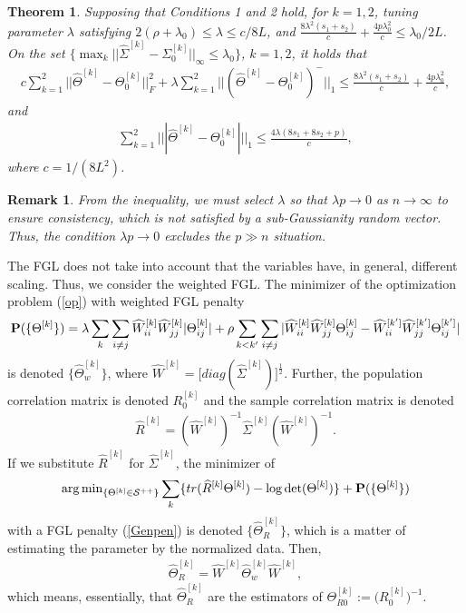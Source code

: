 \documentclass[review]{elsarticle}
\newcommand{\1}{{\bf 1}}
\newcommand{\0}{{\bf 0}}
\newcommand{\bqa}{\begin{eqnarray}}
\newcommand{\eqa}{\end{eqnarray}}
\newtheorem{thm}{Theorem}
\newtheorem{rmk}{Remark}
\begin{document}
\begin{thm}\label{Orcalebounds}
 Supposing that Conditions 1 and 2 hold, for $k=1,2$,
 tuning parameter $\lambda$ satisfying $2(\rho+\lambda_0)\leq\lambda\leq c/8L$, and $\frac{8\lambda^2(s_1+s_2)}{c}+\frac{4p\lambda_0^2}{c}\leq \lambda_0 /2L$. On the set $\{\max_{k}||\widehat{\Sigma}^{[k]}-\Sigma_{0}^{[k]}||_{\infty}\leq\lambda_0\}$, $k=1,2$,
 it holds that
\begin{equation}
\begin{split}
c\sum_{k=1}^{2}||\widehat{\Theta}^{[k]}-\Theta_{0}^{[k]}||_{F}^{2}
+\lambda\sum_{k=1}^{2}||(\widehat{\Theta}^{[k]}-\Theta_{0}^{[k]})^{-}||_1
\leq \frac{8\lambda^2(s_1+s_2)}{c}
+\frac{4p\lambda_0^2}{c},
\end{split}
\end{equation}
 and
\begin{equation}
\begin{split}
\sum_{k=1}^2|||\widehat{\Theta}^{[k]}-\Theta_{0}^{[k]}|||_1\leq\frac{4\lambda(8s_1+8s_2+p)}{c},
\end{split}
\end{equation}
where $c=1/(8L^2)$.
\end{thm}

\begin{rmk}
 From the inequality, we must select $\lambda$ so that $\lambda p\to 0$ as $n\to \infty$ to ensure consistency, which is not satisfied by a sub-Gaussianity random vector.
 Thus, the condition $\lambda p\to 0$ excludes the $p\gg n$ situation.
\end{rmk}

 The FGL does not take into account that the variables have, in general, different scaling.
 Thus, we consider the weighted FGL.
 The minimizer of the optimization problem (\ref{op}) with weighted FGL penalty
\bqa\label{wei}
{\bf{P}}(\{\Theta^{[k]}\})=\lambda\sum_{k}
\sum_{i\neq j}\widehat{W}_{ii}^{[k]}\widehat{W}_{jj}^{[k]}|\Theta_{ij}^{[k]}|
+\rho\sum_{k<k'}\sum_{i\neq j}|\widehat{W}_{ii}^{[k]}\widehat{W}_{jj}^{[k]}\Theta_{ij}^{[k]}
-\widehat{W}_{ii}^{[k']}\widehat{W}_{jj}^{[k']}\Theta_{ij}^{[k']}|
\eqa
 is denoted $\{\widehat{\Theta}_w^{[k]}\}$, where $\widehat{W}^{[k]}=\big[diag(\widehat{\Sigma}^{[k]})\big]^{\frac12}$.
 Further, the population correlation matrix is denoted $R_0^{[k]}$ and the sample correlation matrix is denoted
\bqa
\widehat{R}^{[k]}=(\widehat{W}^{[k]})^{-1}\widehat{\Sigma}^{[k]}
 (\widehat{W}^{[k]})^{-1}.
\eqa
 If we substitute $\widehat{R}^{[k]}$ for $\widehat{\Sigma}^{[k]}$, the minimizer of
\bqa\label{normalized}
{\arg\min}_{\{\Theta^{[k]}\in\mathcal{S}^{++}\}} \sum_{k} \{tr(\widehat{R}^{[k]}\Theta^{[k]})-\log \det(\Theta^{[k]})\}+{\bf{P}}(\{\Theta^{[k]}\})
\eqa
 with a FGL penalty (\ref{Genpen}) is denoted $\{\widehat{\Theta}_R^{[k]}\}$, which is a matter of estimating the parameter by the normalized data.
 Then,
\bqa
\widehat{\Theta}_R^{[k]}=\widehat{W}^{[k]}\widehat{\Theta}_w^{[k]}\widehat{W}^{[k]},
\eqa
 which means, essentially, that $\widehat{\Theta}_R^{[k]}$ are the estimators of $\Theta_{R0}^{[k]}:=\big(R_0^{[k]}\big)^{-1}$.
\end{document}
